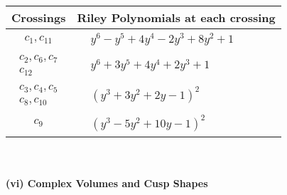 \documentclass[1p]{elsarticle_modified}
\theoremstyle{definition}
\begin{document}
\begin{tabular}{m{50pt}|m{274pt}}
Crossings & \hspace{64pt}Riley Polynomials at each crossing \\
\hline $$\begin{aligned}c_{1},c_{11}\end{aligned}$$&$\begin{aligned}
&y^6- y^5+4 y^4-2 y^3+8 y^2+1
\end{aligned}$\\
\hline $$\begin{aligned}c_{2},c_{6},c_{7}\\c_{12}\end{aligned}$$&$\begin{aligned}
&y^6+3 y^5+4 y^4+2 y^3+1
\end{aligned}$\\
\hline $$\begin{aligned}c_{3},c_{4},c_{5}\\c_{8},c_{10}\end{aligned}$$&$\begin{aligned}
&(y^3+3 y^2+2 y-1)^2
\end{aligned}$\\
\hline $$\begin{aligned}c_{9}\end{aligned}$$&$\begin{aligned}
&(y^3-5 y^2+10 y-1)^2
\end{aligned}$\\
\hline
\end{tabular}\\~\\
\newpage\flushleft \textbf{(vi) Complex Volumes and Cusp Shapes}
\end{document}

